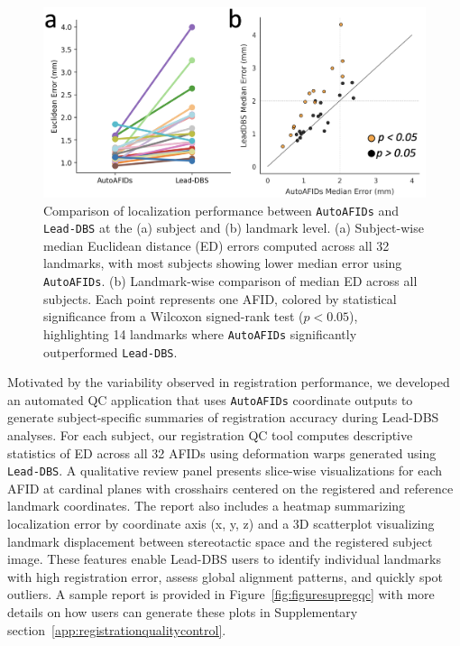 \begin{figure}[hbt!]
    \centering
    \includegraphics[width=1\linewidth]{figs/ch3_Figure_cnnvslead2.png}
    \caption{Comparison of localization performance between \texttt{AutoAFIDs} and \texttt{Lead-DBS} at the (a) subject and (b) landmark level. (a) Subject-wise median Euclidean distance (ED) errors computed across all 32 landmarks, with most subjects showing lower median error using \texttt{AutoAFIDs}. (b) Landmark-wise comparison of median ED across all subjects. Each point represents one AFID, colored by statistical significance from a Wilcoxon signed-rank test (\(p < 0.05\)), highlighting 14 landmarks where \texttt{AutoAFIDs} significantly outperformed \texttt{Lead-DBS}.}
    \label{fig:ch3_Figure_cnnvslead2}
\end{figure}

Motivated by the variability observed in registration performance, we developed an automated QC application that uses \texttt{AutoAFIDs} coordinate outputs to generate subject-specific summaries of registration accuracy during Lead-DBS analyses. For each subject, our registration QC tool computes descriptive statistics of ED across all 32 AFIDs using deformation warps generated using \texttt{Lead-DBS}. A qualitative review panel presents slice-wise visualizations for each AFID at cardinal planes with crosshairs centered on the registered and reference landmark coordinates. The report also includes a heatmap summarizing localization error by coordinate axis (x, y, z) and a 3D scatterplot visualizing landmark displacement between stereotactic space and the registered subject image. These features enable Lead-DBS users to identify individual landmarks with high registration error, assess global alignment patterns, and quickly spot outliers. A sample report is provided in Figure~\ref{fig:figuresupregqc} with more details on how users can generate these plots in Supplementary section~\ref{app:registrationqualitycontrol}.

